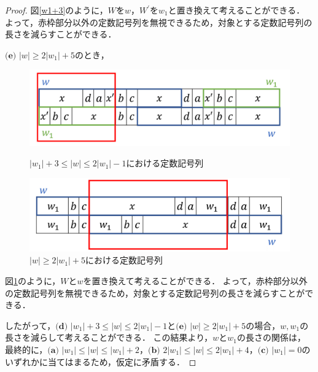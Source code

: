 \begin{proof}

図\ref{w1+3}のように，$W$を$w$，$W^{\prime}$を$w_{1}$と置き換えて考えることができる．
よって，赤枠部分以外の定数記号列を無視できるため，対象とする定数記号列の長さを減らすことができる．

\noindent$\textbf{(e)}$ $|w| \ge 2|w_{1}|+5$のとき，

\begin{figure}
\centering
\includegraphics[width=\linewidth]{画像/w1+3.png}
\vspace{-1cm}
\caption{$|w_{1}|+3 \le |w| \le 2|w_{1}|-1$における定数記号列}
\label{w1+3}

\centering
\includegraphics[width=\linewidth]{画像/2w1+5.png}
\vspace{-1cm}
\caption{$|w| \ge 2|w_{1}|+5$における定数記号列}
\label{2w1+5}
\vspace*{-.3cm}
\end{figure}

図\ref{2w1+5}のように，$W$と$w$を置き換えて考えることができる．
よって，赤枠部分以外の定数記号列を無視できるため，対象とする定数記号列の長さを減らすことができる．

したがって，$\textbf{(d)}$ $|w_{1}|+3 \le |w| \le 2|w_{1}|-1$と$\textbf{(e)}$ $|w| \ge 2|w_{1}|+5$の場合，$w,w_{1}$の長さを減らして考えることができる．
この結果より，$w$と$w_{1}$の長さの関係は，最終的に，$\textbf{(a)}$ $|w_{1}| \le |w| \le |w_{1}|+2$，$\textbf{(b)}$ $2|w_{1}| \le |w| \le 2|w_{1}|+4$，$\textbf{(c)}$ $|w_{1}|=0$のいずれかに当てはまるため，仮定に矛盾する．


\end{proof}
